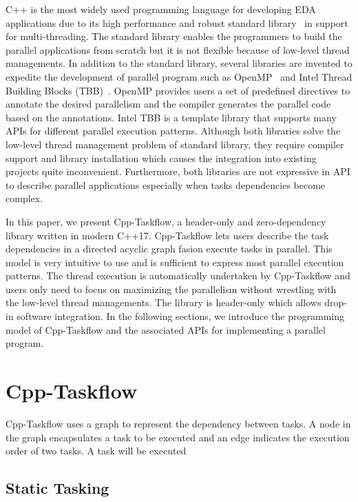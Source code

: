 \documentclass[sigconf]{acmart}
\begin{document}
C++ is the most widely used programming language for developing EDA
applications due to its high performance and robust standard library~\cite{cpp-thread}
in support for multi-threading.
The standard
library enables the programmers to build the parallel applications from scratch 
but it is not flexible because of low-level thread managements.
In addition to the standard library, several libraries are invented to expedite
the development of parallel program such as OpenMP~\cite{openmp} and Intel
Thread Building Blocks (TBB)~\cite{tbb}. OpenMP provides users a set of
predefined directives to annotate the desired parallelism and the compiler generates
the parallel code based on the annotations. Intel TBB is a template library that supports 
many APIs for different parallel execution patterns. Although both libraries 
solve the low-level thread management problem of standard library, they require
compiler support and library installation which causes the integration
into existing projects quite inconvenient. Furthermore, both libraries 
are not expressive in API to describe parallel applications especially
when tasks dependencies become complex.

In this paper, we present Cpp-Taskflow, a header-only and zero-dependency library written in 
modern C++17. Cpp-Taskflow lets users describe the 
task dependencies in a directed acyclic graph fasion execute tasks in parallel.
This model is very intuitive to use
and is sufficient to express most parallel execution patterns. 
The thread execution is automatically undertaken by Cpp-Taskflow and users only need to
focus on maximizing the parallelism without wrestling with the low-level thread
managements. The library is header-only which allows drop-in software integration.
In the following sections, we introduce the programming
model of Cpp-Taskflow and the associated APIs for implementing a parallel
program.



\section{Cpp-Taskflow}
Cpp-Taskflow uses a graph to represent the dependency between tasks. A node in the graph 
encapsulates a task to be executed and an edge indicates the execution order of two tasks.
A task will be executed 

\subsection{Static Tasking}
\end{document}
